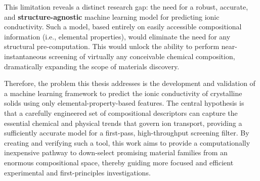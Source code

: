 This limitation reveals a distinct research gap: the need for a robust, accurate, and \textbf{structure-agnostic} machine learning model for predicting ionic conductivity. Such a model, based entirely on easily accessible compositional information (i.e., elemental properties), would eliminate the need for any structural pre-computation. This would unlock the ability to perform near-instantaneous screening of virtually any conceivable chemical composition, dramatically expanding the scope of materials discovery.

Therefore, the problem this thesis addresses is the development and validation of a machine learning framework to predict the ionic conductivity of crystalline solids using only elemental-property-based features. The central hypothesis is that a carefully engineered set of compositional descriptors can capture the essential chemical and physical trends that govern ion transport, providing a sufficiently accurate model for a first-pass, high-throughput screening filter. By creating and verifying such a tool, this work aims to provide a computationally inexpensive pathway to down-select promising material families from an enormous compositional space, thereby guiding more focused and efficient experimental and first-principles investigations.
